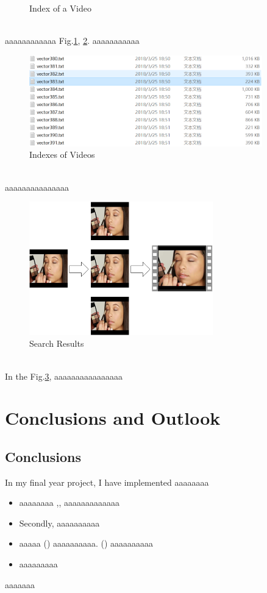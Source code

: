 \documentclass[a4paper,12pt,UTF8]{ctexart}
\newcommand{\rmnum}[1]{\romannumeral #1}
\begin{document}
\begin{spacing}{1.1}
\begin{figure}[h]
	\caption{Index of a Video}
	\label{vector1}
\end{figure}
\\\indent aaaaaaaaaaaa Fig.\ref{vector1}, \ref{vector2}. aaaaaaaaaaa
\begin{figure}[h]
	\centering
	\includegraphics[width=0.9\textwidth]{vector2.png}
	\caption{Indexes of Videos}
	\label{vector2}
\end{figure}
\\\indent aaaaaaaaaaaaaaa 
\begin{figure}[h]
	\centering
	\includegraphics[width=0.71\textwidth]{search1.png}
	\caption{Search Results}
	\label{search1}
\end{figure}
\\\indent In the Fig.\ref{search1}, aaaaaaaaaaaaaaaa
\clearpage
\indent    %
\clearpage
\clearpage
\section{Conclusions and Outlook }
\setcounter{table}{0}  %
\setcounter{figure}{0} %
\subsection{Conclusions}
In my final year project, I have implemented aaaaaaaa
\begin{itemize}
		\setlength{\itemsep}{1.50mm} %
		\setlength{\parskip}{0mm} %
		\setlength{\parsep}{0pt} %
		\item aaaaaaaa \cite{ye2017video},\cite{de2018semantic},\cite{DBLP:journals/tcsv/YinTZ18} aaaaaaaaaaaaa
		\item Secondly, aaaaaaaaaa
		\item aaaaa (\rmnum{1}) aaaaaaaaaa. (\rmnum{2}) aaaaaaaaaa
		\item aaaaaaaaa
\end{itemize}
\indent\indent aaaaaaa

\end{spacing}
\end{document}
